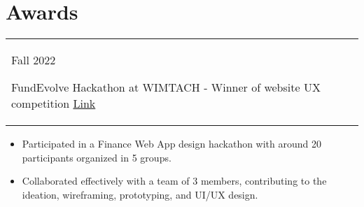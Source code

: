 \documentclass[a4paper,12pt]{article}
\begin{document}
\section{Awards}
\begin{tabularx}{\linewidth}{@{}l X@{}}	
Fall 2022 \
    \begin{minipage}[t]{0.875\linewidth}
    FundEvolve Hackathon at WIMTACH - Winner of website UX competition \hfill\href{https://anth0nywong.github.io/resume/activities/1.0_certificate.pdf}{Link}
 	\end{minipage}\\
\end{tabularx}
\begin{itemize}[nosep,after=\strut, leftmargin=1em, itemsep=3pt]
        \item Participated in a Finance Web App design hackathon with around 20 participants organized in 5 groups.
        \item Collaborated effectively with a team of 3 members, contributing to the ideation, wireframing, prototyping, and UI/UX design.
	\end{itemize}


\vfill
\end{document}
